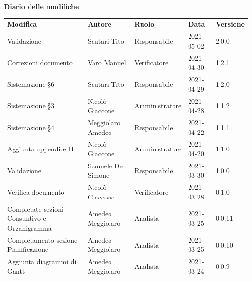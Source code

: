 \documentclass[a4paper]{article}
\begin{document}
\begin{center}
    \textbf{\Large Diario delle modifiche}\\
    \vspace{10px}
    \begin{table}[h!]
        \centering
        \renewcommand{\arraystretch}{1.8}
        \begin{tabular}{p{150px} p{90px} p{80px} p{60px} p{45px}}
            \rowcolor{logo!70} \textbf{Modifica}                          & \textbf{Autore}   & \textbf{Ruolo} & \textbf{Data} & \textbf{Versione} \\
            Validazione                                                   & Scutari Tito      & Responsabile   & 2021-05-02    & 2.0.0             \\
            Correzioni documento                                            & Varo Manuel   & Verificatore   & 2021-04-30    & 1.2.1             \\
            Sistemazione \S 6                                             & Scutari Tito & Responsabile   & 2021-04-29    & 1.2.0             \\
            Sistemazione \S 3                                             & Nicolò Giaccone       & Amministratore & 2021-04-28    & 1.1.2             \\
            Sistemazione \S 4                                             & Meggiolaro Amedeo & Responsabile   & 2021-04-22    & 1.1.1             \\
            Aggiunta appendice B                                          & Nicolò Giaccone       & Amministratore & 2021-04-20    & 1.1.0             \\
            Validazione                                                   & Samuele De Simone & Responsabile   & 2021-03-30    & 1.0.0             \\
            Verifica documento                                            & Nicolò Giaccone   & Verificatore   & 2021-03-28    & 0.1.0             \\
            Completate sezioni Consuntivo e Organigramma                  & Amedeo Meggiolaro & Analista       & 2021-03-25    & 0.0.11            \\
            Completamento sezione Pianificazione                          & Amedeo Meggiolaro & Analista       & 2021-03-25    & 0.0.10            \\
            Aggiunta diagrammi di Gantt                                   & Amedeo Meggiolaro & Analista       & 2021-03-24    & 0.0.9             \\

\end{tabular}
\end{table}
\end{center}
\end{document}
